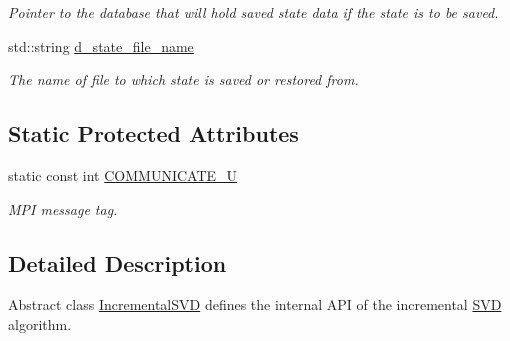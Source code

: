 \begin{DoxyCompactItemize}
\begin{DoxyCompactList}\small\item\em Pointer to the database that will hold saved state data if the state is to be saved. \end{DoxyCompactList}\item 
\hypertarget{class_c_a_r_o_m_1_1_incremental_s_v_d_a744f223bffa3f21c1db1dc2036250ef1}{std\-::string \hyperlink{class_c_a_r_o_m_1_1_incremental_s_v_d_a744f223bffa3f21c1db1dc2036250ef1}{d\-\_\-state\-\_\-file\-\_\-name}}\label{class_c_a_r_o_m_1_1_incremental_s_v_d_a744f223bffa3f21c1db1dc2036250ef1}

\begin{DoxyCompactList}\small\item\em The name of file to which state is saved or restored from. \end{DoxyCompactList}\end{DoxyCompactItemize}
\subsection*{Static Protected Attributes}
\begin{DoxyCompactItemize}
\item 
\hypertarget{class_c_a_r_o_m_1_1_incremental_s_v_d_a4fced260f1783640543bbc9c17cb72fc}{static const int \hyperlink{class_c_a_r_o_m_1_1_incremental_s_v_d_a4fced260f1783640543bbc9c17cb72fc}{C\-O\-M\-M\-U\-N\-I\-C\-A\-T\-E\-\_\-\-U}}\label{class_c_a_r_o_m_1_1_incremental_s_v_d_a4fced260f1783640543bbc9c17cb72fc}

\begin{DoxyCompactList}\small\item\em M\-P\-I message tag. \end{DoxyCompactList}\end{DoxyCompactItemize}


\subsection{Detailed Description}
Abstract class \hyperlink{class_c_a_r_o_m_1_1_incremental_s_v_d}{Incremental\-S\-V\-D} defines the internal A\-P\-I of the incremental \hyperlink{class_c_a_r_o_m_1_1_s_v_d}{S\-V\-D} algorithm. 

